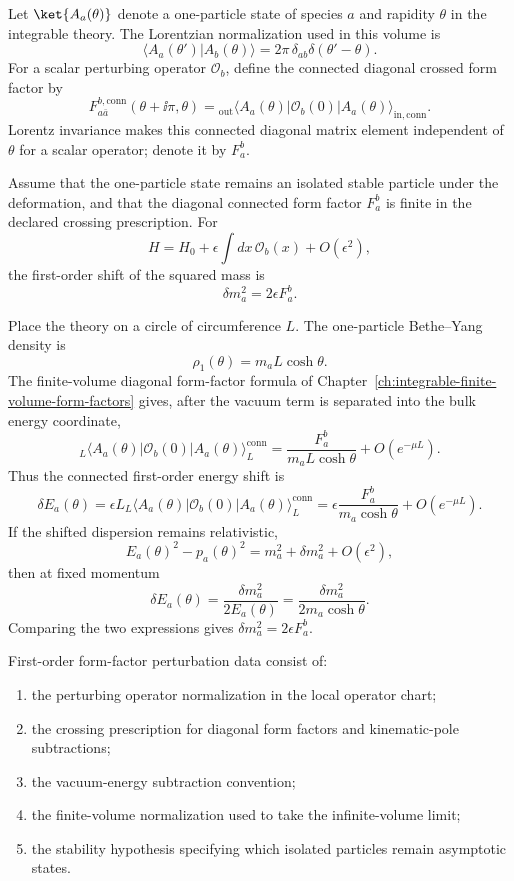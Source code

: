 Let \(\ket{A_a(\theta)}\) denote a one-particle state of species \(a\) and
rapidity \(\theta\) in the integrable theory.  The Lorentzian normalization
used in this volume is
\[
  \langle A_a(\theta')|A_b(\theta)\rangle
  =
  2\pi\,\delta_{ab}\delta(\theta'-\theta).
\]
For a scalar perturbing operator \(\mathcal O_b\), define the connected
diagonal crossed form factor by
\[
  F_{a\bar a}^{b,\mathrm{conn}}(\theta+\ii\pi,\theta)
  =
  {}_{\mathrm{out}}\!\langle A_a(\theta)|
  \mathcal O_b(0)
  |A_a(\theta)\rangle_{\mathrm{in,conn}} .
\]
Lorentz invariance makes this connected diagonal matrix element independent
of \(\theta\) for a scalar operator; denote it by \(F_a^b\).

\begin{controlledapproximation}
\label{ca:ffpt-first-order-mass-shift}
Assume that the one-particle state remains an isolated stable particle under
the deformation, and that the diagonal connected form factor \(F_a^b\) is
finite in the declared crossing prescription.  For
\[
  H=H_0+\epsilon\int dx\,\mathcal O_b(x)+O(\epsilon^2),
\]
the first-order shift of the squared mass is
\[
  \delta m_a^2=2\epsilon F_a^b .
\]
\end{controlledapproximation}

Place the theory on a circle of circumference \(L\).  The one-particle
Bethe--Yang density is
\[
  \rho_1(\theta)=m_aL\cosh\theta .
\]
The finite-volume diagonal form-factor formula of
Chapter~\ref{ch:integrable-finite-volume-form-factors} gives, after the
vacuum term is separated into the bulk energy coordinate,
\[
  {}_L\langle A_a(\theta)|\mathcal O_b(0)|A_a(\theta)\rangle_L^{\mathrm{conn}}
  =
  \frac{F_a^b}{m_aL\cosh\theta}
  +O(e^{-\mu L}).
\]
Thus the connected first-order energy shift is
\[
  \delta E_a(\theta)
  =
  \epsilon L
  {}_L\langle A_a(\theta)|\mathcal O_b(0)|A_a(\theta)\rangle_L^{\mathrm{conn}}
  =
  \epsilon\frac{F_a^b}{m_a\cosh\theta}
  +O(e^{-\mu L}).
\]
If the shifted dispersion remains relativistic,
\[
  E_a(\theta)^2-p_a(\theta)^2=m_a^2+\delta m_a^2+O(\epsilon^2),
\]
then at fixed momentum
\[
  \delta E_a(\theta)
  =
  \frac{\delta m_a^2}{2E_a(\theta)}
  =
  \frac{\delta m_a^2}{2m_a\cosh\theta}.
\]
Comparing the two expressions gives \(\delta m_a^2=2\epsilon F_a^b\).

\begin{definition}
\label{def:form-factor-perturbation-data}
First-order form-factor perturbation data consist of:
\begin{enumerate}
\item the perturbing operator normalization in the local operator chart;
\item the crossing prescription for diagonal form factors and kinematic-pole
subtractions;
\item the vacuum-energy subtraction convention;
\item the finite-volume normalization used to take the infinite-volume limit;
\item the stability hypothesis specifying which isolated particles remain
asymptotic states.
\end{enumerate}
\end{definition}

